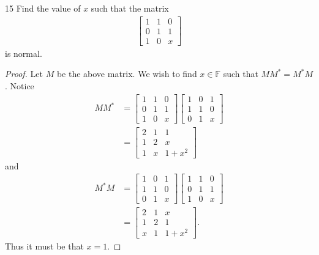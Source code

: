 \documentclass{extarticle}
\newenvironment{problem}[1]{\begin{prob*}{#1}{}}{\end{prob*}}
\newcommand{\F}{\mathbb{F}}
\begin{document}
\begin{problem}{15}
Find the value of $x$ such that the matrix
\begin{align*}
\begin{bmatrix}
1 & 1 & 0 \\
0 & 1 & 1 \\
1 & 0 & x 
\end{bmatrix}
\end{align*}
is normal.
\end{problem}
\begin{proof}
Let $M$ be the above matrix.  We wish to find $x\in \F$ such that $MM^\ast = M^\ast M$.  Notice
\begin{align*}
MM^\ast &= \begin{bmatrix}
1 & 1 & 0 \\
0 & 1 & 1 \\
1 & 0 & x 
\end{bmatrix}
\begin{bmatrix}
1 & 0 & 1 \\
1 & 1 & 0 \\
0 & 1 & x 
\end{bmatrix}\\
&= 
\begin{bmatrix}
2 & 1 & 1 \\
1 & 2 & x \\
1 & x & 1 + x^2 
\end{bmatrix}
\end{align*}
and
\begin{align*}
M^\ast M &= 
\begin{bmatrix}
1 & 0 & 1 \\
1 & 1 & 0 \\
0 & 1 & x 
\end{bmatrix}
\begin{bmatrix}
1 & 1 & 0 \\
0 & 1 & 1 \\
1 & 0 & x 
\end{bmatrix}\\
&= 
\begin{bmatrix}
2 & 1 & x \\
1 & 2 & 1 \\
x & 1 & 1 + x^2 
\end{bmatrix}.
\end{align*}
Thus it must be that $x = 1$.
\end{proof}
\end{document}
